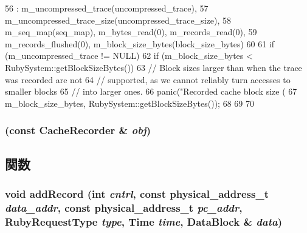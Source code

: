 \begin{DoxyCode}
56     : m_uncompressed_trace(uncompressed_trace),
57       m_uncompressed_trace_size(uncompressed_trace_size),
58       m_seq_map(seq_map),  m_bytes_read(0), m_records_read(0),
59       m_records_flushed(0), m_block_size_bytes(block_size_bytes)
60 {
61     if (m_uncompressed_trace != NULL) {
62         if (m_block_size_bytes < RubySystem::getBlockSizeBytes()) {
63             // Block sizes larger than when the trace was recorded are not
64             // supported, as we cannot reliably turn accesses to smaller blocks
65             // into larger ones.
66             panic("Recorded cache block size (%
67                     m_block_size_bytes, RubySystem::getBlockSizeBytes());
68         }
69     }
70 }
\end{DoxyCode}
\hypertarget{classCacheRecorder_af47a811c6378316ead000ba30b045f1d}{
\subsubsection[{CacheRecorder}]{ (const {\bf CacheRecorder} \& {\em obj})}}
\label{classCacheRecorder_af47a811c6378316ead000ba30b045f1d}


\subsection{関数}
\hypertarget{classCacheRecorder_ae272072fe83d29085b21b133b1c9cd68}{
\subsubsection[{addRecord}]{\setlength{\rightskip}{0pt plus 5cm}void addRecord (int {\em cntrl}, \/  const {\bf physical\_\-address\_\-t} {\em data\_\-addr}, \/  const {\bf physical\_\-address\_\-t} {\em pc\_\-addr}, \/  RubyRequestType {\em type}, \/  {\bf Time} {\em time}, \/  {\bf DataBlock} \& {\em data})}}
\label{classCacheRecorder_ae272072fe83d29085b21b133b1c9cd68}



